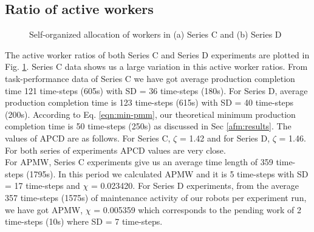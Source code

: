 \documentclass{intech}
\begin{document}
\subsection*{Ratio of active workers}
\begin{figure}
\centering
\hspace*{0.5cm}
\caption{\small Self-organized allocation of workers in (a) Series C and (b) Series D}
\label{fig:plasticity-SC-SD} 
\end{figure}
%
The active worker ratios of both Series C and Series D experiments are plotted in Fig. \ref{fig:plasticity-SC-SD}. Series C data shows us a large variation in this active worker ratios.
From task-performance data of Series C we have got average production completion time 121 time-steps (605s) with SD = 36 time-steps (180s). For Series D,  average production completion time is 123 time-steps (615s) with SD = 40 time-steps (200s). According to Eq. \ref{eqn:min-pmm}, our theoretical minimum production completion time is 50 time-steps (250s) as discussed in Sec \ref{afm:results}.  The values of APCD are as follows. For Series C, $\zeta$ = 1.42 and for Series D, $\zeta$ = 1.46. For both series of experiments APCD values are very close.\\
For APMW, Series C experiments give us an average time length of 359 time-steps (1795s). In this period we calculated APMW and it is 5 time-steps with SD = 17 time-steps and $\chi$ = 0.023420. For Series D experiments, from the average 357 time-steps (1575s) of maintenance activity of our robots per experiment run, we have got APMW, $\chi$ = 0.005359 which corresponds to the pending work of 2 time-steps (10s) where SD = 7 time-steps.
\end{document}
